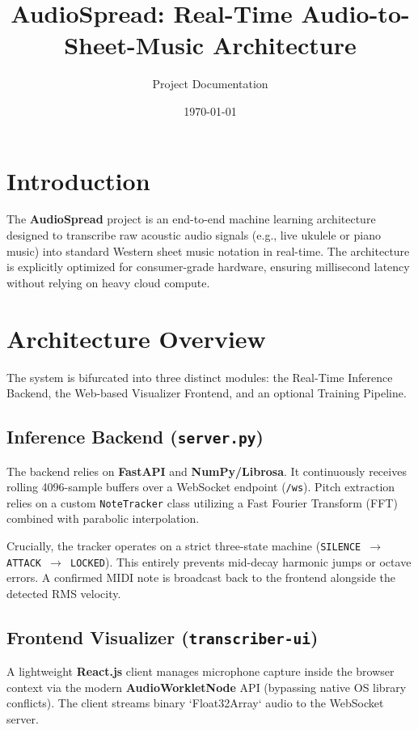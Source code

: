 \documentclass[12pt,a4paper]{article}
\title{\textbf{AudioSpread: Real-Time Audio-to-Sheet-Music Architecture}}
\author{Project Documentation}
\date{\today}
\begin{document}
\maketitle
\tableofcontents
\newpage

\section{Introduction}
The \textbf{AudioSpread} project is an end-to-end machine learning architecture designed to transcribe raw acoustic audio signals (e.g., live ukulele or piano music) into standard Western sheet music notation in real-time. The architecture is explicitly optimized for consumer-grade hardware, ensuring millisecond latency without relying on heavy cloud compute. 

\section{Architecture Overview}
The system is bifurcated into three distinct modules: the Real-Time Inference Backend, the Web-based Visualizer Frontend, and an optional Training Pipeline.

\subsection{Inference Backend (\texttt{server.py})}
The backend relies on \textbf{FastAPI} and \textbf{NumPy/Librosa}. It continuously receives rolling 4096-sample buffers over a WebSocket endpoint (\texttt{/ws}). Pitch extraction relies on a custom \texttt{NoteTracker} class utilizing a Fast Fourier Transform (FFT) combined with parabolic interpolation. 

Crucially, the tracker operates on a strict three-state machine (\texttt{SILENCE $\rightarrow$ ATTACK $\rightarrow$ LOCKED}). This entirely prevents mid-decay harmonic jumps or octave errors. A confirmed MIDI note is broadcast back to the frontend alongside the detected RMS velocity.

\subsection{Frontend Visualizer (\texttt{transcriber-ui})}
A lightweight \textbf{React.js} client manages microphone capture inside the browser context via the modern \textbf{AudioWorkletNode} API (bypassing native OS library conflicts). The client streams binary `Float32Array` audio to the WebSocket server. 
\end{document}
